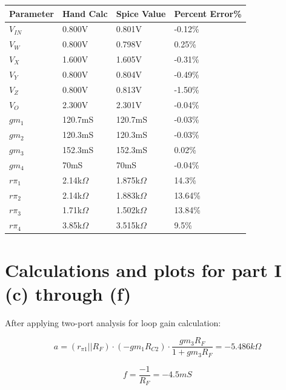 \documentclass[12pt,a4paper]{article}
\begin{document}
\begin{table}[h]
\centering
\begin{tabular}{|l|l|l|l|}
\hline
Parameter & Hand Calc &  Spice Value & Percent Error\% \\
\hline
$V_{IN}$ & 0.800V &  0.801V &  -0.12\%\\
\hline
$V_{W}$ & 0.800V &  0.798V &  0.25\%\\
\hline
$V_{X}$ & 1.600V &  1.605V &  -0.31\%\\
\hline
$V_{Y}$ & 0.800V &  0.804V &  -0.49\%\\
\hline
$V_{Z}$ & 0.800V &  0.813V &  -1.50\%\\
\hline
$V_{O}$ & 2.300V &  2.301V &  -0.04\%\\
\hline
$gm_{1}$ & 120.7mS & 120.7mS &  -0.03\%\\
\hline
$gm_{2}$ & 120.3mS & 120.3mS &  -0.03\%\\
\hline
$gm_{3}$ & 152.3mS & 152.3mS &  0.02\%\\
\hline
$gm_{4}$ & 70mS & 70mS &  -0.04\%\\
\hline
$r\pi_{1}$ & 2.14k$\Omega$ & 1.875k$\Omega$ &  14.3\%\\
\hline
$r\pi_{2}$ & 2.14k$\Omega$ & 1.883k$\Omega$ &  13.64\%\\
\hline
$r\pi_{3}$ & 1.71k$\Omega$ & 1.502k$\Omega$ &  13.84\%\\
\hline
$r\pi_{4}$ & 3.85k$\Omega$ & 3.515k$\Omega$ &  9.5\%\\
\hline
\end{tabular}
\end{table}

\pagebreak


\section{Calculations and plots for part I (c) through (f)}

After applying two-port analysis for loop gain calculation:

\begin{equation}
  a = (r_{\pi1} || R_{F}) \cdot (-gm_1 R_{C2} ) \cdot \frac{gm_3 R_F}{1 + gm_3 R_F} = -5.486k\Omega
\end{equation}

\begin{equation}
  f = \frac{-1}{R_F} = -4.5mS
\end{equation}
\end{document}
